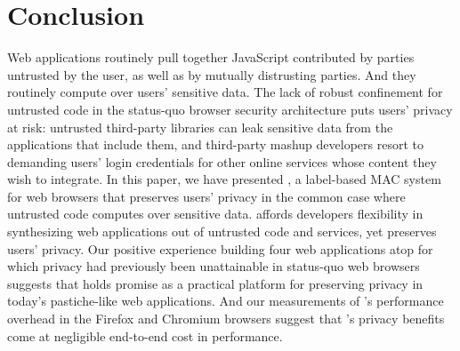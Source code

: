 \section{Conclusion}
\label{sec:conclusion}

Web applications routinely pull together JavaScript contributed by
parties untrusted by the user, as well as by mutually distrusting
parties. And they routinely compute over users' sensitive data. The
lack of robust confinement for untrusted code in the status-quo
browser security architecture puts users' privacy at risk: untrusted
third-party libraries can leak sensitive data from the applications
that include them, and third-party mashup developers resort to
demanding users' login credentials for other online services whose
content they wish to integrate. In this paper, we have presented
\sys{}, a label-based MAC system for web browsers that preserves
users' privacy in the common case where untrusted code computes over
sensitive data. \sys{} affords developers flexibility in synthesizing
web applications out of untrusted code and services, yet preserves
users' privacy. Our positive experience building four web applications
atop \sys{} for which privacy had previously been unattainable in
status-quo web browsers suggests that \sys{} holds promise as a
practical platform for preserving privacy in today's pastiche-like web
applications. And our measurements of \sys{}'s performance overhead in
the Firefox and Chromium browsers suggest that \sys{}'s privacy
benefits come at negligible end-to-end cost in performance.

